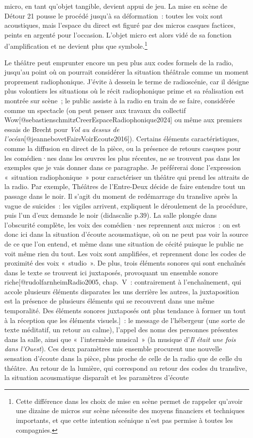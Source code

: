 \documentclass[
]{article}
\begin{document}
micro, en tant qu'objet tangible, devient appui de jeu. La mise en scène de Détour 21 pousse le procédé jusqu'à sa déformation~: toutes les voix sont acoustiques, mais l'espace du direct est figuré par des micros casques factices, peints en argenté pour l'occasion. L'objet micro est alors vidé de sa fonction d'amplification et ne devient plus que symbole.\footnote{Cette différence dans les choix de mise en scène permet de rappeler qu'avoir une dizaine de micros sur scène nécessite des moyens financiers et techniques importants, et que cette intention scénique n'est pas permise à toutes les compagnies.}

Le théâtre peut emprunter encore un peu plus aux codes formels de la radio, jusqu'au point où on pourrait considérer la situation théâtrale comme un moment proprement radiophonique. J'évite à dessein le terme de radioscénie, car il désigne plus volontiers les situations où le récit radiophonique prime et sa réalisation est montrée sur scène~; le public assiste à la radio en train de se faire, considérée comme un spectacle (on peut penser aux travaux du collectif Wow{[}@sebastienschmitzCreerEspaceRadiophonique2024{]} ou même aux premiers essais de Brecht pour \emph{Vol au dessus de l'océan}{[}@jeannebovetFaireVoirEcoute2016{]}). Certains éléments caractéristiques, comme la diffusion en direct de la pièce, ou la présence de retours casques pour les comédien·nes dans les œuvres les plus récentes, ne se trouvent pas dans les exemples que je vais donner dans ce paragraphe. Je préférerai donc l'expression «~situation radiophonique~» pour caractériser un théâtre qui prend les attraits de la radio. Par exemple, Théâtres de l'Entre-Deux décide de faire entendre tout un passage dans le noir. Il s'agit du moment de redémarrage du translive après la vague de suicides~: les vigiles arrivent, expliquent le déroulement de la procédure, puis l'un d'eux demande le noir (didascalie p.39). La salle plongée dans l'obscurité complète, les voix des comédien·nes reprennent aux micros~: on est donc ici dans la situation d'écoute acousmatique, où on ne peut pas voir la source de ce que l'on entend, et même dans une situation de cécité puisque le public ne voit même rien du tout. Les voix sont amplifiées, et reprennent donc les codes de proximité des voix «~studio~». De plus, trois éléments sonores qui sont enchaînés dans le texte se trouvent ici juxtaposés, provoquant un ensemble sonore riche{[}@rudolfarnheimRadio2005, chap.~V~: contrairement à l'enchaînement, qui accole plusieurs éléments disparates les uns derrière les autres, la juxtaposition est la présence de plusieurs éléments qui se recouvrent dans une même temporalité. Des éléments sonores juxtaposés ont plus tendance à former un tout à la réception que les éléments visuels.{]}~: le message de l'hébergeur (une sorte de texte méditatif, un retour au calme), l'appel des noms des personnes présentes dans la salle, ainsi que «~l'intermède musical~» (la musique d'\emph{Il était une fois dans l'Ouest}). Ces deux paramètres mis ensemble procurent une nouvelle sensation d'écoute dans la pièce, plus proche de celle de la radio que de celle du théâtre. Au retour de la lumière, qui correspond au retour des codes du translive, la situation acousmatique disparaît et les paramètres d'écoute 
\end{document}
